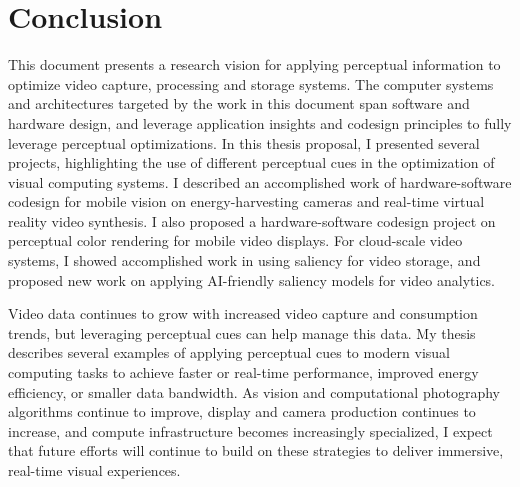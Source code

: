 \chapter{Conclusion}
\label{ch:concl}

This document presents a research vision for applying perceptual information to optimize video capture, processing and storage systems.
The computer systems and architectures targeted by the work in this document span software and hardware design, and leverage application insights and codesign principles to fully leverage perceptual optimizations.
In this thesis proposal, I presented several projects, highlighting the use of different perceptual cues in the optimization of visual computing systems. I described an accomplished work of hardware-software codesign for mobile vision on energy-harvesting cameras and real-time virtual reality video synthesis. I also proposed a hardware-software codesign project on perceptual color rendering for mobile video displays.
For cloud-scale video systems, I showed accomplished work in using saliency for video storage, and proposed new work on applying AI-friendly saliency models for video analytics.

Video data continues to grow with increased video capture and consumption trends, but leveraging perceptual cues can help manage this data.
My thesis describes several examples of applying perceptual cues to modern visual computing tasks to achieve faster or real-time performance, improved energy efficiency, or smaller data bandwidth.
As vision and computational photography algorithms continue to improve, display and camera production continues to increase, and compute infrastructure becomes increasingly specialized, I expect that future efforts will continue to build on these strategies to deliver immersive, real-time visual experiences.
